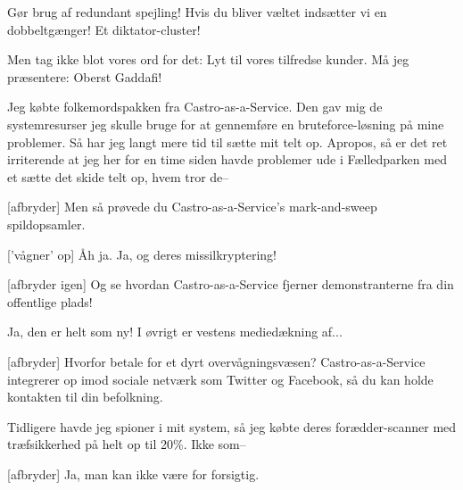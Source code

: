 \documentclass[a4paper,11pt]{article}
\begin{document}
\begin{sketch}

   Gør brug af redundant spejling! Hvis du bliver væltet
  indsætter vi en dobbeltgænger!  Et diktator-cluster!


   Men tag ikke blot vores ord for det: Lyt til vores
  tilfredse kunder.  Må jeg præsentere: Oberst Gaddafi!


   Jeg købte folkemordspakken fra Castro-as-a-Service.  Den
  gav mig de systemresurser jeg skulle bruge for at gennemføre en
  bruteforce-løsning på mine problemer.  Så har jeg langt mere tid til
  sætte mit telt op.  Apropos, så er det ret irriterende at jeg her for
  en time siden havde problemer ude i Fælledparken med et sætte det
  skide telt op, hvem tror de--

  [afbryder] Men så prøvede du Castro-as-a-Service's mark-and-sweep
  spildopsamler.


  ['vågner' op] Åh ja.  Ja, og deres missilkryptering!


  [afbryder igen] Og se hvordan Castro-as-a-Service fjerner
  demonstranterne fra din offentlige plads!


   Ja, den er helt som ny! I øvrigt er vestens mediedækning af... 

  [afbryder] Hvorfor betale for et dyrt overvågningsvæsen?
  Castro-as-a-Service integrerer op imod sociale netværk som Twitter
  og Facebook, så du kan holde kontakten til din befolkning.



   Tidligere havde jeg spioner i mit system, så jeg købte
  deres forædder-scanner med træfsikkerhed på helt op til 20\%.  Ikke som--

  [afbryder] Ja, man kan ikke være for forsigtig.


\end{sketch}
\end{document}
